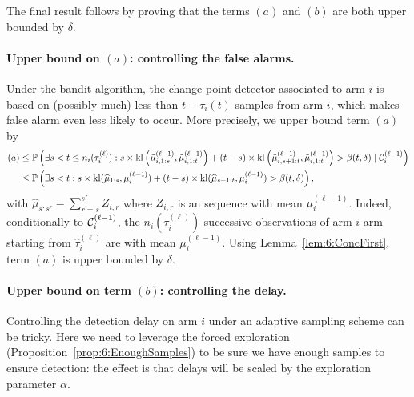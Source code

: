 The final result follows by proving that the terms $(a)$ and $(b)$ are both upper bounded by $\delta$.

\paragraph{Upper bound on $(a)$: controlling the false alarms.}
Under the bandit algorithm, the change point detector associated to arm $i$ is based on (possibly much) less than $t - \tau_i(t)$ samples from arm $i$, which makes false alarm even less likely to occur. More precisely, we upper bound term $(a)$ by
%
\begin{align*}
    (a) & \leq \mathbb{P}\left(\exists s < t \leq n_i(\tau_i^{(\ell)}) : s \times \mathrm{kl}\left(\tilde{\mu}_{i,1:s}^{(\ell-1)},\tilde{\mu}_{i,1:t}^{(\ell-1)}\right) + (t - s) \times \mathrm{kl}\left(\tilde{\mu}_{i,s+1:t}^{(\ell-1)},\tilde{\mu}_{i,1:t}^{(\ell-1)}\right) > \beta(t, \delta) \;|\; \mathcal{C}_i^{(\ell-1)}\right) \\
    & \leq \mathbb{P}\left(\exists s < t : s \times \mathrm{kl}(\widehat{\mu}_{1:s},\mu_i^{(\ell-1)}) + (t - s) \times \mathrm{kl}(\widehat{\mu}_{s+1:t}, \mu_{i}^{(\ell-1)}) > \beta(t, \delta)\right),
\end{align*}
with $\hat\mu_{s:s'} = \sum_{r=s}^{s'} Z_{i,r}$ where $Z_{i,r}$ is an \iid{} sequence with mean $\mu_i^{(\ell-1)}$.
Indeed, conditionally to $\mathcal{C}_i^{(\ell-1)}$, the $n_i(\tau_i^{(\ell)})$ successive observations of arm $i$ arm starting from $\hat \tau_i^{(\ell)}$ are \iid{} with mean $\mu_i^{(\ell-1)}$.
Using Lemma~\ref{lem:6:ConcFirst}, term $(a)$ is upper bounded by $\delta$.


\paragraph{Upper bound on term $(b)$: controlling the delay.}
%
Controlling the detection delay on arm $i$ under an adaptive sampling scheme can be tricky. Here we need to leverage the forced exploration (Proposition~\ref{prop:6:EnoughSamples}) to be sure we have enough samples to ensure detection: the effect is that delays will be scaled by the exploration parameter $\alpha$.

